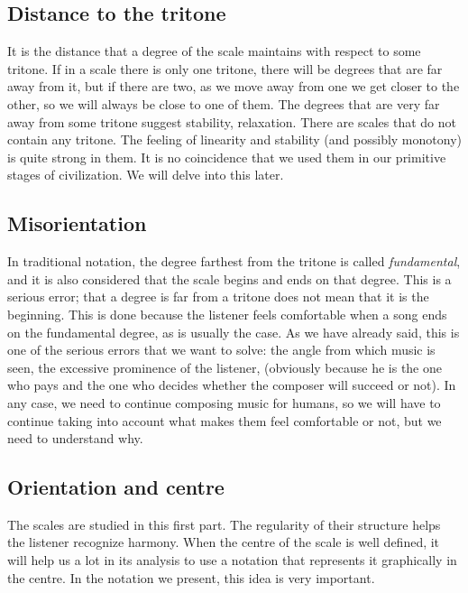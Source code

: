 \documentclass[]{report}
\begin{document}
\subsection{Distance to the tritone}
It is the distance that a degree of the scale maintains with respect to some tritone. If in a scale there is only one tritone, there will be degrees that are far away from it, but if there are two, as we move away from one we get closer to the other, so we will always be close to one of them.
The degrees that are very far away from some tritone suggest stability, relaxation. There are scales that do not contain any tritone. The feeling of linearity and stability (and possibly monotony) is quite strong in them. It is no coincidence that we used them in our primitive stages of civilization. We will delve into this later.
\subsection{Misorientation}
In traditional notation, the degree farthest from the tritone is called \emph{fundamental}, and it is also considered that the scale begins and ends on that degree. This is a serious error; that a degree is far from a tritone does not mean that it is the beginning. This is done because the listener feels comfortable when a song ends on the fundamental degree, as is usually the case. As we have already said, this is one of the serious errors that we want to solve: the angle from which music is seen, the excessive prominence of the listener, (obviously because he is the one who pays and the one who decides whether the composer will succeed or not). In any case, we need to continue composing music for humans, so we will have to continue taking into account what makes them feel comfortable or not, but we need to understand why.
\subsection{Orientation and centre}
The scales are studied in this first part. The regularity of their structure
helps the listener recognize harmony. When the centre of the
scale is well defined, it will help us a lot in its analysis to use a notation
that represents it graphically in the centre. In the notation we present, this
idea is very important.
\end{document}
